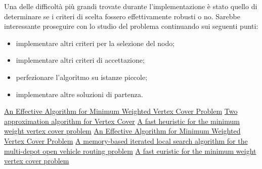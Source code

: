 \documentclass[11pt]{article}
\begin{document}
\begin{table}[!ht]
\begin{tabular}{|l|l|l|l|}
    \end{tabular}
\end{table}

\pagebreak

Una delle difficoltà più grandi trovate durante l'implementazione è stato quello di determinare se i criteri di scelta fossero effettivamente robusti o no. Sarebbe interessante proseguire con lo studio del problema continuando sui seguenti punti:

\begin{itemize}
    \item{implementare altri criteri per la selezione del nodo;}
    \item{implementare altri criteri di accettazione;}
    \item{perfezionare l'algoritmo su istanze piccole;}
    \item{implementare altre soluzioni di partenza.}
\end{itemize}

\pagebreak

\begin{thebibliography}{6}

 \href{https://www.researchgate.net/publication/242463011_An_Effective_Algorithm_for_Minimum_Weighted_Vertex_Cover_problem}{An Effective Algorithm for Minimum Weighted Vertex Cover Problem}
 \href{https://www.cs.umd.edu/class/fall2018/cmsc858E/pdfs/651/vc.pdf} {Two approximation algorithm for Vertex Cover} 
 \href{https://ieeexplore.ieee.org/abstract/document/7550782}{A fast heuristic for the minimum weight vertex cover problem}
 \href{https://www.researchgate.net/publication/242463011_An_Effective_Algorithm_for_Minimum_Weighted_Vertex_Cover_problem}{An Effective Algorithm for Minimum Weighted Vertex Cover Problem}
 \href{https://www.sciencedirect.com/science/article/abs/pii/S0377221720300278}{A memory-based iterated local search algorithm for the multi-depot open vehicle routing problem}
 \href{https://ieeexplore.ieee.org/document/7550782}{A fast euristic for the minimum weight vertex cover problem}

\end{thebibliography}


\pagebreak
\end{document}
